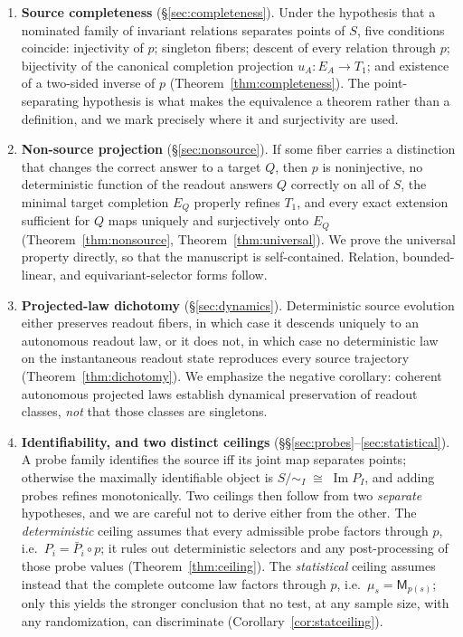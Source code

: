 \documentclass[11pt,reqno]{amsart}
\theoremstyle{plain}
\theoremstyle{definition}
\theoremstyle{remark}
\DeclareMathOperator{\Ima}{Im}
\begin{document}
\begin{enumerate}
\item \textbf{Source completeness} (\S\ref{sec:completeness}). Under the hypothesis that a nominated family of invariant relations separates points of $S$, five conditions coincide: injectivity of $p$; singleton fibers; descent of every relation through $p$; bijectivity of the canonical completion projection $u_A\colon E_A\to T_1$; and existence of a two-sided inverse of $p$ (Theorem~\ref{thm:completeness}). The point-separating hypothesis is what makes the equivalence a theorem rather than a definition, and we mark precisely where it and surjectivity are used.

\item \textbf{Non-source projection} (\S\ref{sec:nonsource}). If some fiber carries a distinction that changes the correct answer to a target $Q$, then $p$ is noninjective, no deterministic function of the readout answers $Q$ correctly on all of $S$, the minimal target completion $E_Q$ properly refines $T_1$, and every exact extension sufficient for $Q$ maps uniquely and surjectively onto $E_Q$ (Theorem~\ref{thm:nonsource}, Theorem~\ref{thm:universal}). We prove the universal property directly, so that the manuscript is self-contained. Relation, bounded-linear, and equivariant-selector forms follow.

\item \textbf{Projected-law dichotomy} (\S\ref{sec:dynamics}). Deterministic source evolution either preserves readout fibers, in which case it descends uniquely to an autonomous readout law, or it does not, in which case no deterministic law on the instantaneous readout state reproduces every source trajectory (Theorem~\ref{thm:dichotomy}). We emphasize the negative corollary: coherent autonomous projected laws establish dynamical preservation of readout classes, \emph{not} that those classes are singletons.

\item \textbf{Identifiability, and two distinct ceilings} (\S\S\ref{sec:probes}--\ref{sec:statistical}). A probe family identifies the source iff its joint map separates points; otherwise the maximally identifiable object is $S/\!\sim_I\;\cong\;\Ima P_I$, and adding probes refines monotonically. Two ceilings then follow from two \emph{separate} hypotheses, and we are careful not to derive either from the other. The \emph{deterministic} ceiling assumes that every admissible probe factors through $p$, i.e.\ $P_i=\bar P_i\circ p$; it rules out deterministic selectors and any post-processing of those probe values (Theorem~\ref{thm:ceiling}). The \emph{statistical} ceiling assumes instead that the complete outcome law factors through $p$, i.e.\ $\mu_s=\mathsf M_{p(s)}$; only this yields the stronger conclusion that no test, at any sample size, with any randomization, can discriminate (Corollary~\ref{cor:statceiling}).


\end{enumerate}
\end{document}
